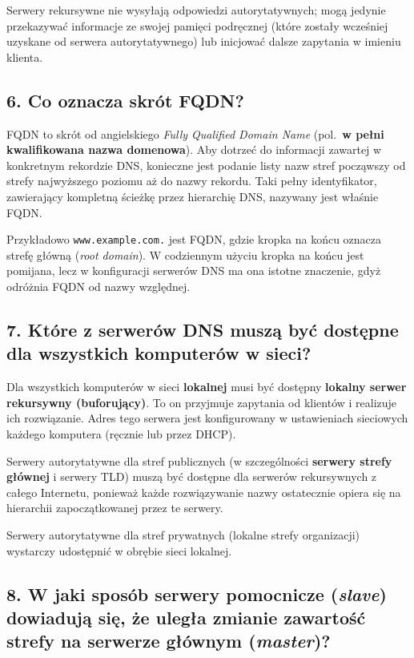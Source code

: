 \documentclass[12pt,a4paper]{article}
\begin{document}
Serwery rekursywne nie wysyłają odpowiedzi autorytatywnych; mogą jedynie
przekazywać informacje ze swojej pamięci podręcznej (które zostały wcześniej
uzyskane od serwera autorytatywnego) lub inicjować dalsze zapytania w imieniu
klienta.

\subsection*{6. Co oznacza skrót FQDN?}

FQDN to skrót od angielskiego \emph{Fully Qualified Domain Name} (pol.\
\textbf{w pełni kwalifikowana nazwa domenowa}). Aby dotrzeć do informacji zawartej
w konkretnym rekordzie DNS, konieczne jest podanie listy nazw stref począwszy od
strefy najwyższego poziomu aż do nazwy rekordu. Taki pełny identyfikator, zawierający
kompletną ścieżkę przez hierarchię DNS, nazywany jest właśnie FQDN.

Przykładowo \texttt{www.example.com.} jest FQDN, gdzie kropka na końcu oznacza
strefę główną (\emph{root domain}). W codziennym użyciu kropka na końcu jest
pomijana, lecz w konfiguracji serwerów DNS ma ona istotne znaczenie, gdyż odróżnia
FQDN od nazwy względnej.

\subsection*{7. Które z serwerów DNS muszą być dostępne dla wszystkich komputerów
w sieci?}

Dla wszystkich komputerów w sieci \textbf{lokalnej} musi być dostępny
\textbf{lokalny serwer rekursywny (buforujący)}. To on przyjmuje zapytania od
klientów i realizuje ich rozwiązanie. Adres tego serwera jest konfigurowany
w ustawieniach sieciowych każdego komputera (ręcznie lub przez DHCP).

Serwery autorytatywne dla stref publicznych (w szczególności \textbf{serwery
strefy głównej} i serwery TLD) muszą być dostępne dla serwerów rekursywnych
z całego Internetu, ponieważ każde rozwiązywanie nazwy ostatecznie opiera się
na hierarchii zapoczątkowanej przez te serwery.

Serwery autorytatywne dla stref prywatnych (lokalne strefy organizacji) wystarczy
udostępnić w obrębie sieci lokalnej.

\subsection*{8. W jaki sposób serwery pomocnicze (\emph{slave}) dowiadują się,
że uległa zmianie zawartość strefy na serwerze głównym (\emph{master})?}
\end{document}
